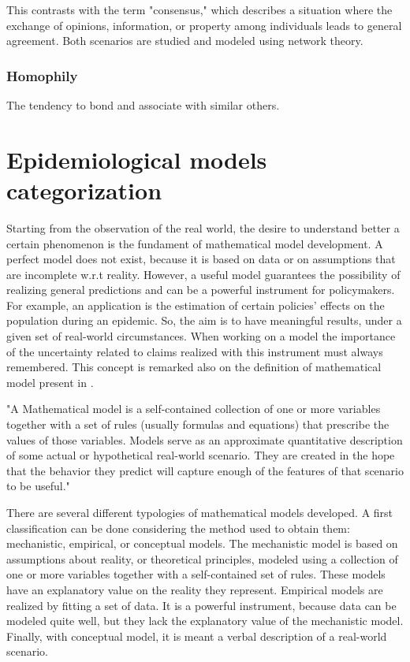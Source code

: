  This contrasts with the term "consensus," which describes a situation where the exchange of opinions, information, or property among individuals leads to general agreement. Both scenarios are studied and modeled using network theory.

\subsubsection{Homophily} The tendency to bond and associate with similar others. 

\section{Epidemiological models categorization}
Starting from the observation of the real world, the desire to understand better a certain phenomenon is the fundament of mathematical model development. A perfect model does not exist, because it is based on data or on assumptions that are incomplete w.r.t reality. However, a useful model guarantees the possibility of realizing general predictions and can be a powerful instrument for policymakers.  For example, an application is the estimation of certain policies' effects on the population during an epidemic. So, the aim is to have meaningful results, under a given set of real-world circumstances.
When working on a model the importance of the uncertainty related to claims realized with this instrument must always remembered. This concept is remarked also on the definition of mathematical model present in \cite{Ledder_2023}. 
\begin{displayquote}
	"A Mathematical model is a self-contained collection of one or more variables together with a set of rules (usually formulas and equations) that prescribe the values of those variables. Models serve as an approximate quantitative description of some actual or hypothetical real-world scenario. They are created in the hope that the behavior they predict will capture enough of the features of that scenario to be useful."
\end{displayquote}

There are several different typologies of mathematical models developed.
A first classification can be done considering the method used to obtain them: mechanistic, empirical, or conceptual models.
The mechanistic model is based on assumptions about reality, or theoretical principles, modeled using a collection of one or more variables together with a self-contained set of rules. These models have an explanatory value on the reality they represent.
Empirical models are realized by fitting a set of data. It is a powerful instrument, because data can be modeled quite well, but they lack the explanatory value of the mechanistic model.  Finally, with conceptual model, it is meant a verbal description of a real-world scenario. 


